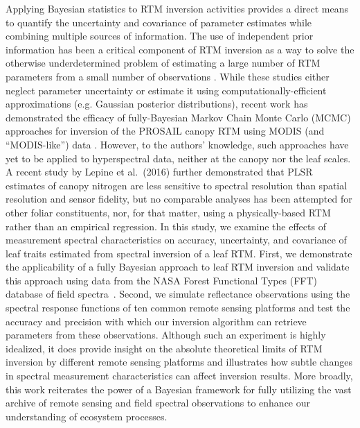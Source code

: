 Applying Bayesian statistics to RTM inversion activities provides a direct means to quantify the uncertainty and covariance of parameter estimates while combining multiple sources of information.
The use of independent prior information has been a critical component of RTM inversion as a way to solve the otherwise underdetermined problem of estimating a large number of RTM parameters from a small number of observations%
\cite{combal_2003_retrieval,lauvernet_2008_multitemporal,yao_2008_lai,pinty_2011_exploiting,laurent_2014_bayesian,mousivand_2015_multitemporal}.
While these studies either neglect parameter uncertainty or estimate it using computationally-efficient approximations (e.g. Gaussian posterior distributions), recent work has demonstrated the efficacy of fully-Bayesian Markov Chain Monte Carlo (MCMC) approaches for inversion of the PROSAIL canopy RTM using MODIS (and “MODIS-like”) data%
\cite{zhang_2005_estimating,zhang_2006_characterization,zhang_2009_satellite}.
However, to the authors’ knowledge, such approaches have yet to be applied to hyperspectral data, neither at the canopy nor the leaf scales.
A recent study by Lepine et al.~(2016) \nocite{lepine_2016_examining} further demonstrated that PLSR estimates of canopy nitrogen are less sensitive to spectral resolution than spatial resolution and sensor fidelity, but no comparable analyses has been attempted for other foliar constituents, nor, for that matter, using a physically-based RTM rather than an empirical regression. 
In this study, we examine the effects of measurement spectral characteristics on accuracy, uncertainty, and covariance of leaf traits estimated from spectral inversion of a leaf RTM\@.
First, we demonstrate the applicability of a fully Bayesian approach to leaf RTM inversion and validate this approach using data from the NASA Forest Functional Types (FFT) database of field spectra~\cite{serbin_spectroscopic_2014,singh_imaging_2015}.
Second, we simulate reflectance observations using the spectral response functions of ten common remote sensing platforms and test the accuracy and precision with which our inversion algorithm can retrieve parameters from these observations.
Although such an experiment is highly idealized, it does provide insight on the absolute theoretical limits of RTM inversion by different remote sensing platforms and illustrates how subtle changes in spectral measurement characteristics can affect inversion results. 
More broadly, this work reiterates the power of a Bayesian framework for fully utilizing the vast archive of remote sensing and field spectral observations to enhance our understanding of ecosystem processes.
